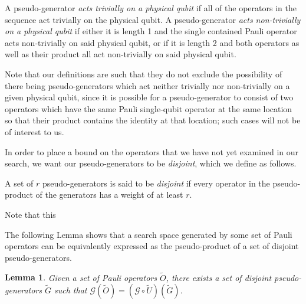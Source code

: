 \documentclass[twocolumn,showpacs,preprintnumbers,amsmath,amssymb,nofootinbib,pra,floatfix]{revtex4-1}
\newtheorem{lemma}{Lemma}
\newenvironment{definition}[1][Definition]{\begin{trivlist}
\item[\hskip \labelsep {\bfseries #1}]}{\end{trivlist}}
\newenvironment{remark}[1][Remark]{\begin{trivlist}
\item[\hskip \labelsep {\bfseries #1}]}{\end{trivlist}}
\newcommand{\set}{\tilde}
\newcommand{\genfun}{\mathcal{G}}
\begin{document}
\begin{definition}
A pseudo-generator \emph{acts trivially on a physical qubit} if all of the operators in the sequence act trivially on the physical qubit.
A pseudo-generator \emph{acts non-trivially on a physical qubit} if either it is length 1 and the single contained Pauli operator acts non-trivially on said physical qubit, or if it is length 2 and both operators as well as their product all act non-trivially on said physical qubit.  
\end{definition}
\begin{remark}
Note that our definitions are such that they do not exclude the possibility of there being pseudo-generators which act neither trivially nor non-trivially on a given physical qubit, since it is possible for a pseudo-generator to consist of two operators which have the same Pauli single-qubit operator at the same location so that their product contains the identity at that location;  such cases will not be of interest to us.

In order to place a bound on the operators that we have not yet examined in our search, we want our pseudo-generators to be \emph{disjoint}, which we define as follows.
\end{remark}

\begin{definition}
A set of $r$ pseudo-generators is said to be \emph{disjoint} if every operator in the pseudo-product of the generators has a weight of at least $r$.
\end{definition}
\begin{remark}
Note that this 

The following Lemma shows that a search space generated by some set of Pauli operators can be equivalently expressed as the pseudo-product of a set of disjoint pseudo-generators.
\end{remark}

\begin{lemma}
Given a set of Pauli operators $\set O$, there exists a set of disjoint pseudo-generators $\set G$ such that $\genfun(\set O)=(\genfun\circ\set U)(\set G)$.
\end{lemma}
\end{document}
